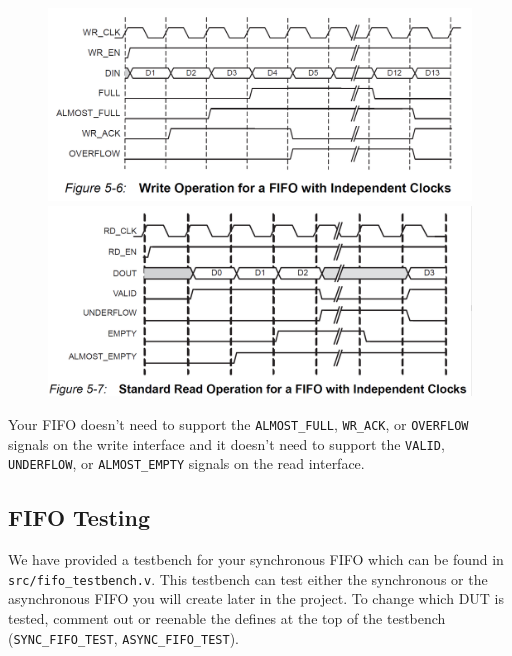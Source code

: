 \documentclass[11pt]{article}
\begin{document}
\begin{figure}[H]
	\includegraphics[width=\linewidth]{sync_fifo_write_operation.png}
	\endminipage\hfill
	\includegraphics[width=\linewidth]{sync_fifo_read_operation.png}
	\endminipage
\end{figure}

Your FIFO doesn't need to support the \verb|ALMOST_FULL|, \verb|WR_ACK|, or \verb|OVERFLOW| signals on the write interface and it doesn't need to support the \verb|VALID|, \verb|UNDERFLOW|, or \verb|ALMOST_EMPTY| signals on the read interface.

\subsection{FIFO Testing}
We have provided a testbench for your synchronous FIFO which can be found in \verb|src/fifo_testbench.v|. This testbench can test either the synchronous or the asynchronous FIFO you will create later in the project. To change which DUT is tested, comment out or reenable the defines at the top of the testbench (\verb|SYNC_FIFO_TEST|, \verb|ASYNC_FIFO_TEST|).
\end{document}
